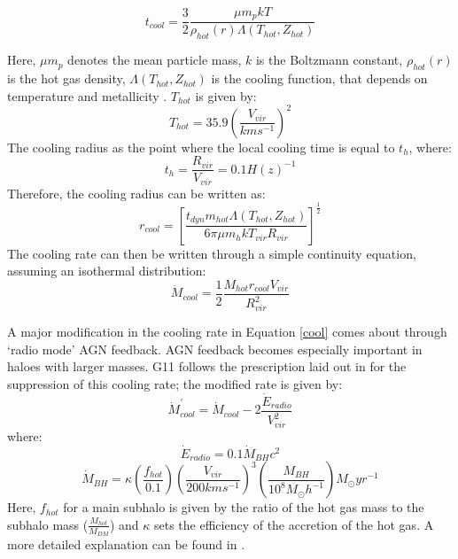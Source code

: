\documentclass[a4paper,fleqn,usenatbib]{mnras}
\begin{document}
\begin{equation}
t_{cool} = \frac{3}{2} \frac{\mu m_p k T}{\rho_{hot}(r) \Lambda (T_{hot},Z_{hot})}
\end{equation}

Here, $\mu m_p$ denotes the mean particle mass, $k$ is the Boltzmann constant, $\rho_{hot}(r)$ is the hot gas density, $\Lambda(T_{hot}, Z_{hot})$ is the cooling function, that depends on temperature and metallicity \citep{sutherland1993cooling}. $T_{hot}$ is given by: 
\begin{equation}
T_{hot} = 35.9 \left(\frac{V_{vir}}{km s^{-1}}\right)^2 
\end{equation}
The cooling radius as the point where the local cooling time is equal to $t_h$, where:
\begin{equation}
t_h = \frac{R_{vir}}{V_{vir}} = 0.1 H(z)^{-1}
\end{equation}
Therefore, the cooling radius can be written as: 
\begin{equation}
r_{cool} = \left[\frac{t_{dyn} m_{hot} \Lambda (T_{hot},Z_{hot})}{6 \pi \mu m_h k T_{vir} R_{vir}}\right]^{\frac{1}{2}}
\label{rcool}
\end{equation}
The cooling rate can then be written through a simple continuity equation, assuming an isothermal distribution:
\begin{equation}
\dot M_{cool} = \frac{1}{2} \frac{M_{hot} r_{cool} V_{vir}}{R_{vir}^2}
\label{cool}
\end{equation}
\par
A major modification in the cooling rate in Equation \ref{cool} comes about through `radio mode' AGN feedback. AGN feedback becomes especially important in haloes with larger masses. G11 follows the prescription laid out in \citet{croton2006many} for the suppression of this cooling rate; the modified rate is given by:
\begin{equation}
\dot M_{cool}^{'} = \dot M_{cool} - 2 \frac{\dot E_{radio}}{V_{vir}^2}
\label{mod_cool}
\end{equation}
where:
\begin{equation}
\dot E_{radio} = 0.1 \dot M_{BH} c^2
\end{equation}
\begin{equation}
\dot M_{BH} = \kappa \left(\frac{f_{hot}}{0.1}\right) \left(\frac{V_{vir}}{200 kms^{-1}}\right)^3 \left(\frac{M_{BH}}{10^8 M_{\odot} h^{-1}}\right) M_{\odot} yr^{-1}
\end{equation}
Here, $f_{hot}$ for a main subhalo is given by the ratio of the hot gas mass to the subhalo mass ($\frac{M_{hot}}{M_{DM}}$) and $\kappa$ sets the efficiency of the accretion of the hot gas. A more detailed explanation can be found in \citet{guo2011dwarf}. 
\end{document}
